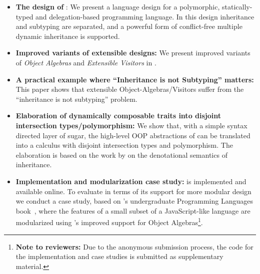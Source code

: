 \begin{itemize}

\item {\bf The design of \name}: We present a language design for a polymorphic,
  statically-typed and delegation-based programming language. In this design
  inheritance and subtyping are separated, and a powerful form of conflict-free
  multiple dynamic inheritance is supported.

\item {\bf Improved variants of extensible designs:} We present
  improved variants of \emph{Object
    Algebras} and \emph{Extensible Visitors} in \name. 

\item {\bf A practical example where ``Inheritance is not Subtyping'' matters:}
  This paper shows that extensible Object-Algebras/Visitors suffer from the
  ``inheritance is not subtyping'' problem.

\item {\bf Elaboration of dynamically composable traits into disjoint
    intersection types/polymorphism:} We show that, with a simple syntax directed layer of
  sugar, the high-level OOP abstractions of \name can be translated into a
  calculus with disjoint intersection types and polymorphism. The elaboration is
  based on the work by \citet{cook1989denotational} on the denotational semantics of
  inheritance.

\item {\bf Implementation and modularization case study:} \name is implemented
  and available online. To evaluate \name in terms of its support for more
  modular design we conduct a case study, based on \citeauthor{poplcook}'s undergraduate
  Programming Languages book~\cite{poplcook}, where the features of a small
  subset of a JavaScript-like language are modularized using \name's improved
  support for Object Algebras\footnote{{\bf Note to reviewers:} Due to the
    anonymous submission process, the code for the implementation and case
    studies is submitted as supplementary material.}.

\end{itemize}

